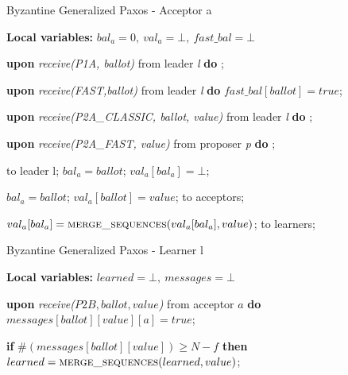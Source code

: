 \begin{algorithm} 
	\caption{Byzantine Generalized Paxos - Acceptor a}
	\label{BFT-Acc}
	\textbf{Local variables:} $bal_a = 0,\ val_a = \bot,\ fast\_bal = \bot$ 
	\begin{algorithmic}[1]
		\State \textbf{upon} \textit{receive(P1A, ballot)} from leader \textit{l} \textbf{do}
		\State \hspace{\algorithmicindent} ;
		
		\State
		\State \textbf{upon} \textit{receive(FAST,ballot)} from leader \textit{l} \textbf{do}
		\State \hspace{\algorithmicindent} $fast\_bal[ballot] = true$;
		
		\State
		\State \textbf{upon} \textit{receive(P2A\_CLASSIC, ballot, value)} from leader \textit{l} \textbf{do}
		\State \hspace{\algorithmicindent} ; 

		\State		
		\State \textbf{upon} \textit{receive(P2A\_FAST, value)} from proposer \textit{p} \textbf{do}
		\State \hspace{\algorithmicindent} ;
				
		\State
		\State {} to leader l;
		\State $bal_a = ballot$;	
		\State $val_a[bal_a] = \bot$;	
		\EndIf
		\EndFunction
	
		\State
		\State $bal_a = ballot$;
		\State $val_a[ballot] = value$;
		\State {} to acceptors;
		\EndIf
		\EndFunction
		
		\State
		\State $val_a[bal_a] =  \Call{merge\_sequences}{val_a[bal_a], value}$;
		\State {} to learners;
		\EndIf
		\EndFunction
	\end{algorithmic}
\end{algorithm}


\begin{algorithm}
	\caption{Byzantine Generalized Paxos - Learner l}
	\label{BFT-Learn}
	\textbf{Local variables:} $learned = \bot,\ messages = \bot$ 
	\begin{algorithmic}[1]
		\State \textbf{upon} \textit{receive($P2B, ballot, value$)} from acceptor $a$ \textbf{do}
		\State \hspace{\algorithmicindent} $messages[ballot][value][a] = true$;
		
		\State \hspace{\algorithmicindent} \textbf{if} $\#(messages[ballot][value]) \geq N-f$ \textbf{then}
		\State \hspace{\algorithmicindent}\hspace{\algorithmicindent}\hspace{\algorithmicindent}\hspace{\algorithmicindent}
		$learned = \Call{merge\_sequences}{learned, value}$;
	\end{algorithmic}
\end{algorithm}